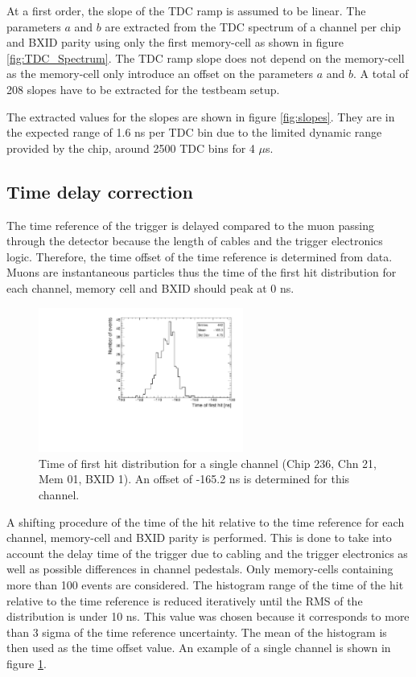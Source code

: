At a first order, the slope of the TDC ramp is assumed to be linear. The parameters $a$ and $b$ are extracted from the TDC spectrum of a channel per chip and BXID parity using only the first memory-cell as shown in figure \ref{fig:TDC_Spectrum}. The TDC ramp slope does not depend on the memory-cell as the memory-cell only introduce an offset on the parameters $a$ and $b$. A total of 208 slopes have to be extracted for the testbeam setup.

The extracted values for the slopes are shown in figure \ref{fig:slopes}. They are in the expected range of 1.6 ns per TDC bin due to the limited dynamic range provided by the chip, around 2500 TDC bins for 4 $\mu$s.

\subsection{Time delay correction}

The time reference of the trigger is delayed compared to the muon passing through the detector because the length of cables and the trigger electronics logic. Therefore, the time offset of the time reference is determined from data. Muons are instantaneous particles thus the time of the first hit distribution for each channel, memory cell and BXID should peak at 0 ns.

\begin{figure}[htbp!]
	\centering
	\includegraphics[width=0.6\textwidth]{fig/Timing_Chip236_Chn21_Mem01_BXID1_withOffset.pdf}
	\caption{Time of first hit distribution for a single channel (Chip 236, Chn 21, Mem 01, BXID 1). An offset of -165.2 ns is determined for this channel.}\label{fig:TimeChnwithOffset}
\end{figure}

A shifting procedure of the time of the hit relative to the time reference for each channel, memory-cell and BXID parity is performed. This is done to take into account the delay time of the trigger due to cabling and the trigger electronics as well as possible differences in channel pedestals. Only memory-cells containing more than 100 events are considered. The histogram range of the time of the hit relative to the time reference is reduced iteratively until the RMS of the distribution is under 10 ns. This value was chosen because it corresponds to more than 3 sigma of the time reference uncertainty. The mean of the histogram is then used as the time offset value. An example of a single channel is shown in figure \ref{fig:TimeChnwithOffset}.

